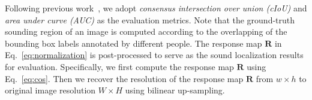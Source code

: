 Following previous work~\cite{av_cvpr19_deep_cluster,av_arxiv_curricumlum_av_clutser,av_eccv20_mms_loc,av_cvpr18_lls,av_tpami20_lls}, we adopt \textit{consensus intersection over union (cIoU)} and \textit{area under curve (AUC)} as the evaluation metrics.
%
Note that the ground-truth sounding region of an image is computed according to the overlapping of the bounding box labels annotated by different people.
%
The response map $\mathbf{R}$ in Eq.~\eqref{eq:normalization} is post-processed to serve as the sound localization results for evaluation.
%
Specifically, we first compute the response map $\mathbf{R}$ using Eq.~\eqref{eq:cos}.
%
Then we recover the resolution of the response map $\mathbf{R}$ from $w\times h$ to original image resolution $W \times H$ using bilinear up-sampling.
\begin{comment}
\yb{
Following~\cite{av_cvpr18_lls,av_tpami20_lls,av_eccv20_mms_loc,av_cvpr19_deep_cluster,av_arxiv_curricumlum_av_clutser}, 
the bounding box annotations of sounding regions in coordinate form are transformed into binary maps.
% 
The binary maps indicate whether each pixel is sounding or not.
% 
The pixels are labels as scores from 0 to 1, which is based on the overlapped of human annotations.
% 
Given ground truth score maps and predicted results, 
\textbf{consensus intersection over union (cIoU)} and \textbf{area under curve (AUC)} are performed for measuring the quality of predicted sound localization results.
}
\end{comment}



